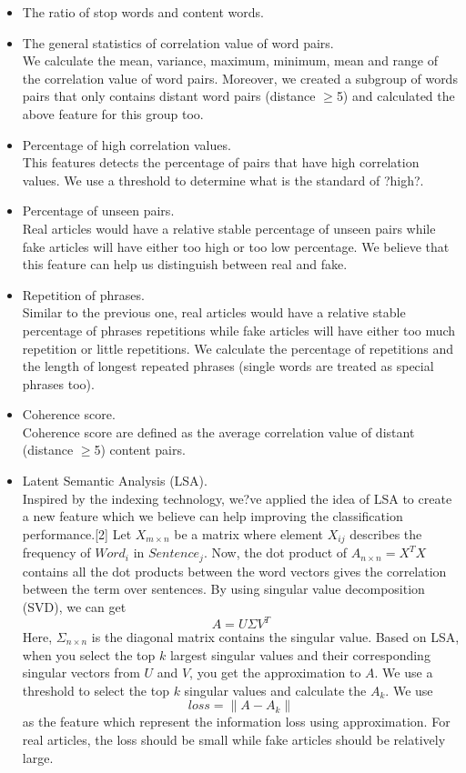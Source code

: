 \begin{itemize}
  \setlength{\itemsep}{4pt}
    \setlength{\parskip}{0pt}
  \item The ratio of stop words and content words.
  \item The general statistics of correlation value of word pairs.\\[5pt]
We calculate the mean, variance, maximum, minimum, mean and range of the correlation value of word pairs. Moreover, we created a subgroup of words pairs that only contains distant word pairs (distance  $\geq$5) and calculated the above feature for this group too.
 \item Percentage of high correlation values.\\[5pt]
This features detects the percentage of pairs that have high correlation values. We use a threshold to determine what is the standard of ?high?.
 \item Percentage of unseen pairs.\\[5pt]
Real articles would have a relative stable percentage of unseen pairs while fake articles will have either too high or too low percentage. We believe that this feature can help us distinguish between real and fake.
 \item Repetition of phrases.\\[5pt]
Similar to the previous one, real articles would have a relative stable percentage of phrases repetitions while fake articles will have either too much repetition or little repetitions. We calculate the percentage of repetitions and the length of longest repeated phrases (single words are treated as special phrases too).
 \item Coherence score.\\[5pt]
Coherence score are defined as the average correlation value of distant (distance $\geq$5) content pairs.
 \item Latent Semantic Analysis (LSA).\\[5pt]
Inspired by the indexing technology, we?ve applied the idea of LSA to create a new feature which we believe can help improving the classification performance.[2] Let $X_{m\times{n}}$ be a matrix where element $X_{ij}$ describes the frequency of $Word_{i}$ in $Sentence_{j}$. Now, the dot product of $A_{n\times{n}} = X^{T}X$ contains all the dot products between the word vectors gives the correlation between the term over sentences. By using singular value decomposition (SVD), we can get  \begin{equation}
	A = U\Sigma{V^T}	
\end{equation}
Here, $\Sigma_{n\times{n}}$ is the diagonal matrix contains the singular value. Based on LSA, when you select the top $k$ largest singular values and their corresponding singular vectors from $U$ and $V$, you get the approximation to $A$. We use a threshold to select the top $k$ singular values and calculate the $A_{k}$. We use
\begin{equation}
	loss = \|A - A_{k}\|
\end{equation}
as the feature which represent the information loss using approximation. For real articles, the loss should be small while fake articles should be relatively large.


\end{itemize}
